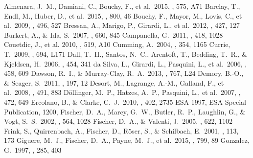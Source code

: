 \documentclass[]{pasj01}
\begin{document}
\begin{thebibliography}{}
Almenara, J.~M., Damiani, C., Bouchy, F., et al.\ 2015, \aap, 575, A71 
Barclay, T., Endl, M., Huber, D., et al.\ 2015, \apj, 800, 46 
Bouchy, F., Mayor, M., Lovis, C., et al.\ 2009, \aap, 496, 527 
Bressan, A., Marigo, P., Girardi, L., et al.\ 2012, \mnras, 427, 127 
Burkert, A., \& Ida, S.\ 2007, \apj, 660, 845 
Campanella, G.\ 2011, \mnras, 418, 1028 
Couetdic, J., et al. 2010, \aap, 519, A10
Cumming, A.\ 2004, \mnras, 354, 1165 
Currie, T.\ 2009, \apjl, 694, L171 
Dall, T.~H., Santos, N.~C., Arentoft, T., Bedding, T.~R., \& Kjeldsen, H.\ 2006, \aap, 454, 341 
da Silva, L., Girardi, L., Pasquini, L., et al.\ 2006, \aap, 458, 609
Dawson, R.~I., \& Murray-Clay, R.~A.\ 2013, \apjl, 767, L24 
Demory, B.-O., \& Seager, S.\ 2011, \apjs, 197, 12 
Desort, M., Lagrange, A.-M., Galland, F., et al.\ 2008, \aap, 491, 883 
D{\"o}llinger, M.~P., Hatzes, A.~P., Pasquini, L., et al.\ 2007, \aap, 472, 649 
Ercolano, B., \& Clarke, C.~J.\ 2010, \mnras, 402, 2735 
ESA 1997, ESA Special Publication, 1200, 
Fischer, D.~A., Marcy, G.~W., Butler, R.~P., Laughlin, G., \& Vogt, S.~S.\ 2002, \apj, 564, 1028 
Fischer, D.~A., \& Valenti, J.\ 2005, \apj, 622, 1102 
Frink, S., Quirrenbach, A., Fischer, D., R{\"o}ser, S., \& Schilbach, E.\ 2001, \pasp, 113, 173 
Giguere, M.~J., Fischer, D.~A., Payne, M.~J., et al.\ 2015, \apj, 799, 89 
Gonzalez, G.\ 1997, \mnras, 285, 403 

\end{thebibliography}
\end{document}
